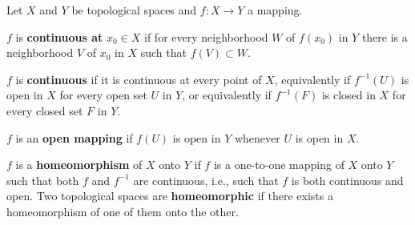 Let $X$ and $Y$ be topological spaces and $f: X \to Y$ a mapping.

$f$ is \textbf{continuous at} $x_0 \in X$ if for every neighborhood $W$ of $f(x_0)$ in $Y$ there is a neighborhood $V$ of $x_0$ in $X$ such that $f(V) \subset W$.

$f$ is \textbf{continuous} if it is continuous at every point of $X$, equivalently if $f^{-1}(U)$ is open in $X$ for every open set $U$ in $Y$, or equivalently if $f^{-1}(F)$ is closed in $X$ for every closed set $F$ in $Y$.

$f$ is an \textbf{open mapping} if $f(U)$ is open in $Y$ whenever $U$ is open in $X$.

$f$ is a \textbf{homeomorphism} of $X$ onto $Y$ if $f$ is a one-to-one mapping of $X$ onto $Y$ such that both $f$ and $f^{-1}$ are continuous, i.e., such that $f$ is both continuous and open. Two topological spaces are \textbf{homeomorphic} if there exists a homeomorphism of one of them onto the other.
